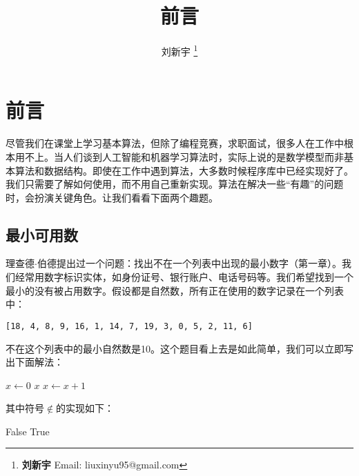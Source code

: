 \documentclass[b5paper]{ctexart}
\begin{document}

\title{前言}

\author{刘新宇
\thanks{{\bfseries 刘新宇} \newline
  Email: liuxinyu95@gmail.com \newline}
  }

\maketitle
\fi


\chapter*{前言}

尽管我们在课堂上学习基本算法，但除了编程竞赛，求职面试，很多人在工作中根本用不上。当人们谈到人工智能和机器学习算法时，实际上说的是数学模型而非基本算法和数据结构。即使在工作中遇到算法，大多数时候程序库中已经实现好了。我们只需要了解如何使用，而不用自己重新实现。算法在解决一些“有趣”的问题时，会扮演关键角色。让我们看看下面两个趣题。

\section*{最小可用数}
\label{min-free} 

理查德$\cdot$伯德提出过一个问题：找出不在一个列表中出现的最小数字（\cite{fp-pearls}第一章）。我们经常用数字标识实体，如身份证号、银行账户、电话号码等。我们希望找到一个最小的没有被占用数字。假设都是自然数，所有正在使用的数字记录在一个列表中：

\begin{verbatim}
[18, 4, 8, 9, 16, 1, 14, 7, 19, 3, 0, 5, 2, 11, 6]
\end{verbatim}

不在这个列表中的最小自然数是10。这个题目看上去是如此简单，我们可以立即写出下面解法：

\begin{algorithmic}[1]
  \State $x \gets 0$
  \Loop
      \State \Return $x$
    \Else
      \State $x \gets x + 1$
    \EndIf
  \EndLoop
\EndFunction
\end{algorithmic}

其中符号$\notin$的实现如下：

\begin{algorithmic}[1]
      \State \Return False
    \EndIf
  \EndFor
  \State \Return True
\EndFunction
\end{algorithmic}
\end{document}
